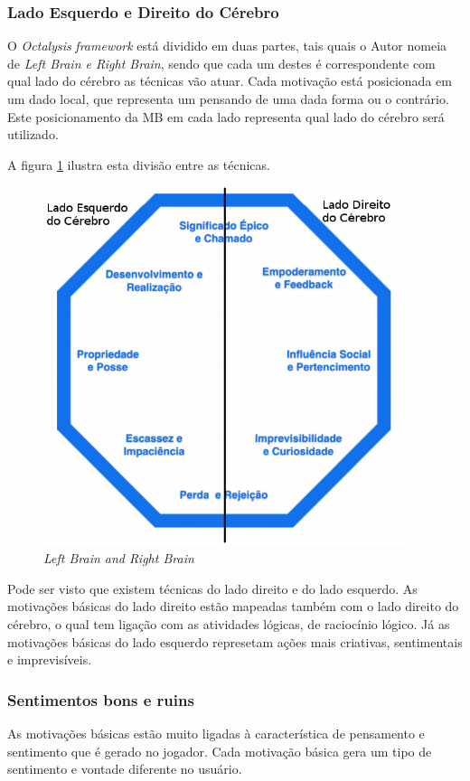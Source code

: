 \subsubsection{Lado Esquerdo e Direito do Cérebro}
\label{sub:leftright}
O \textit{Octalysis} \textit{framework} está dividido em duas partes, tais quais o Autor nomeia
de \textit{Left Brain e Right Brain}, sendo que cada um destes é correspondente com qual lado do cérebro
as técnicas vão atuar. Cada motivação está posicionada em um dado local, que
representa um pensando de uma dada forma ou o contrário. Este posicionamento
da MB em cada lado representa qual lado do cérebro será utilizado.

A figura \ref{fig:octalysisleftright} ilustra esta divisão entre as técnicas.

\begin{figure}[h]
    \centering
    \includegraphics[width=400px, scale=1]{figuras/octalysisleftright}
    \caption{\textit{Left Brain and Right Brain}}
    \label{fig:octalysisleftright}
\end{figure}

Pode ser visto que existem técnicas do lado direito e do lado esquerdo. As
motivações básicas do lado direito estão mapeadas também com o lado direito
do cérebro, o qual tem ligação com as atividades lógicas, de raciocínio lógico.
Já as motivações básicas do lado esquerdo represetam ações mais criativas,
sentimentais e imprevisíveis.

\subsubsection{Sentimentos bons e ruins}
\label{sub:whiteblack}
As motivações básicas estão muito ligadas à característica de pensamento e
sentimento que é gerado no jogador. Cada motivação básica gera um tipo de
sentimento e vontade diferente no usuário.

